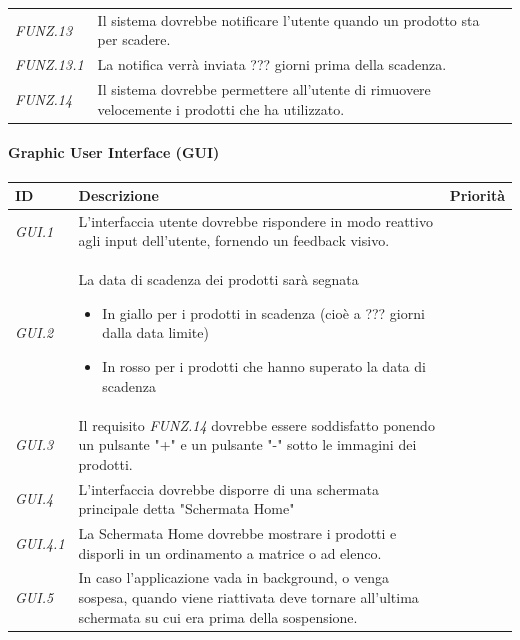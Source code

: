 \documentclass{article}
\newcommand{\must}{\cellcolor{Green}{M}}
\newcommand{\should}{\cellcolor{LimeGreen}{S}}
\newcommand{\could}{\cellcolor{RedOrange}{C}}
\newcommand{\wont}{\cellcolor{BrickRed}{W}}
\begin{document}
\begin{center}
\begin{longtable}{p{50pt}p{250pt}c}
         \textit{FUNZ.13} & Il sistema dovrebbe notificare l'utente quando un prodotto sta per scadere. & \must \\
         \textit{FUNZ.13.1} & La notifica verrà inviata ??? giorni prima della scadenza. & \should  \\
         \textit{FUNZ.14} & Il sistema dovrebbe permettere all'utente di rimuovere velocemente i prodotti che ha utilizzato. & \should \\
         \bottomrule
    \end{longtable} 
\end{center}

\paragraph{Graphic User Interface (GUI)}
\begin{center}
    \begin{tabular}{p{50pt}p{250pt}c}
    \toprule
        ID & Descrizione & Priorità \\
        \midrule
         \textit{GUI.1} & L'interfaccia utente dovrebbe rispondere in modo reattivo agli input dell'utente, fornendo un feedback visivo. & \should \\
         \textit{GUI.2} & La data di scadenza dei prodotti sarà segnata \begin{itemize}
             \item In giallo per i prodotti in scadenza (cioè a ??? giorni dalla data limite)
             \item In rosso per i prodotti che hanno superato la data di scadenza
         \end{itemize} & \should \\
         \textit{GUI.3} & Il requisito \textit{FUNZ.14} dovrebbe essere soddisfatto ponendo un pulsante "+" e un pulsante "-" sotto le immagini dei prodotti. & \could \\
         \textit{GUI.4} & L'interfaccia dovrebbe disporre di una schermata principale detta "Schermata Home" & \must  \\
         \textit{GUI.4.1} & La Schermata Home dovrebbe mostrare i prodotti e disporli in un ordinamento a matrice o ad elenco. & \must \\
         \textit{GUI.5} & In caso l'applicazione vada in background, o venga sospesa, quando viene riattivata deve tornare all'ultima schermata su cui era prima della sospensione. & \wont \\
         \bottomrule
    \end{tabular} 
\end{center}
\end{document}
